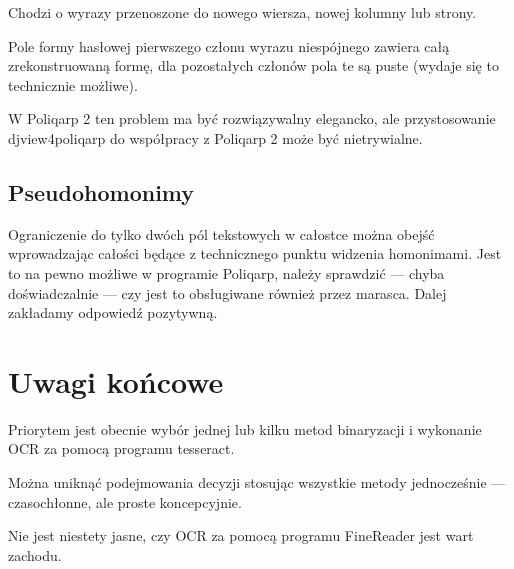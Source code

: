 \documentclass[12]{mwart}
\newcommand{\program}[1]{\textsf{#1}}
\begin{document}
Chodzi o wyrazy przenoszone do nowego wiersza, nowej kolumny lub strony.

Pole formy hasłowej pierwszego członu wyrazu niespójnego zawiera całą
zrekonstruowaną formę, dla pozostałych członów pola te są puste
(wydaje się to technicznie możliwe).


W \program{Poliqarp 2} ten problem ma być rozwiązywalny
elegancko, ale przystosowanie \program{djview4poliqarp} do współpracy
z \program{Poliqarp 2} może być nietrywialne.

\subsection{Pseudohomonimy}
\label{sec:pseudohomonimy}

Ograniczenie do tylko dwóch pól tekstowych w całostce można obejść
wprowadzając całości będące z technicznego punktu widzenia homonimami.
Jest to na pewno możliwe w programie \textsf{Poliqarp}, należy
sprawdzić --- chyba doświadczalnie --- czy jest to obsługiwane również
przez \textsf{marasca}. Dalej zakładamy odpowiedź pozytywną.










\section{Uwagi końcowe}
\label{sec:uwagi-kocowe}

Priorytem jest obecnie wybór jednej lub kilku metod binaryzacji i
wykonanie OCR za pomocą programu \textsf{tesseract}.

Można uniknąć podejmowania decyzji stosując wszystkie metody
jednocześnie --- czasochłonne, ale proste koncepcyjnie.

Nie jest niestety jasne, czy OCR za pomocą programu \textsf{FineReader}
jest wart zachodu.
\end{document}
